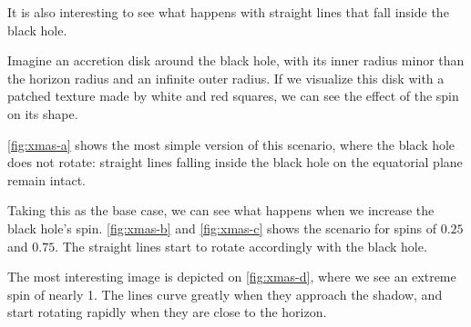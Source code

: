 It is also interesting to see what happens with straight lines that fall inside the black hole.

Imagine an accretion disk around the black hole, with its inner radius minor than the horizon radius and an infinite outer radius. If we visualize this disk with a patched texture made by white and red squares, we can see the effect of the spin on its shape.

\autoref{fig:xmas-a} shows the most simple version of this scenario, where the black hole does not rotate: straight lines falling inside the black hole on the equatorial plane remain intact.

Taking this as the base case, we can see what happens when we increase the black hole's spin. \autoref{fig:xmas-b} and \autoref{fig:xmas-c} shows the scenario for spins of $0.25$ and $0.75$. The straight lines start to rotate accordingly with the black hole.

The most interesting image is depicted on \autoref{fig:xmas-d}, where we see an extreme spin of nearly 1. The lines curve greatly when they approach the shadow, and start rotating rapidly when they are close to the horizon.

